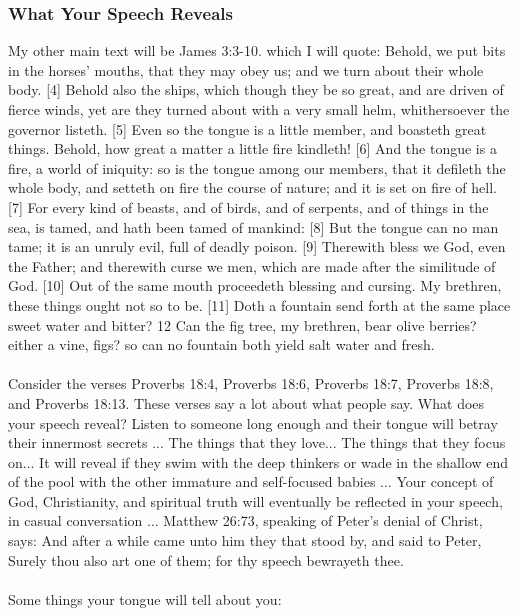 \subsubsection{What Your Speech Reveals}
My other main text will be James 3:3-10. which I will quote:  Behold, we put bits in the horses’ mouths, that they may obey us; and we turn about their whole body. [4] Behold also the ships, which though they be so great, and are driven of fierce winds, yet are they turned about with a very small helm, whithersoever the governor listeth. [5] Even so the tongue is a little member, and boasteth great things. Behold, how great a matter a little fire kindleth! [6] And the tongue is a fire, a world of iniquity: so is the tongue among our members, that it defileth the whole body, and setteth on fire the course of nature; and it is set on fire of hell. [7] For every kind of beasts, and of birds, and of serpents, and of things in the sea, is tamed, and hath been tamed of mankind: [8] But the tongue can no man tame; it is an unruly evil, full of deadly poison. [9] Therewith bless we God, even the Father; and therewith curse we men, which are made after the similitude of God. [10] Out of the same mouth proceedeth blessing and cursing. My brethren, these things ought not so to be. [11] Doth a fountain send forth at the same place sweet water and bitter? 12 Can the fig tree, my brethren, bear olive berries? either a vine, figs? so can no fountain both yield salt water and fresh.\\
\\
Consider the verses Proverbs 18:4, Proverbs 18:6, Proverbs 18:7, Proverbs 18:8, and Proverbs 18:13.  These verses say a lot about what people say. What does your speech reveal? Listen to someone long enough and their tongue will betray their innermost secrets ... The things that they love... The things that they focus on... It will reveal if they swim with the deep thinkers or wade in the shallow end of the pool with the other immature and self-focused babies ... Your concept of God, Christianity, and spiritual truth will eventually be reflected in your speech, in casual conversation ... Matthew 26:73, speaking of Peter's denial of Christ, says: And after a while came unto him they that stood by, and said to Peter, Surely thou also art one of them; for thy speech bewrayeth thee.\\
\\
Some things your tongue will tell about you:
\\

